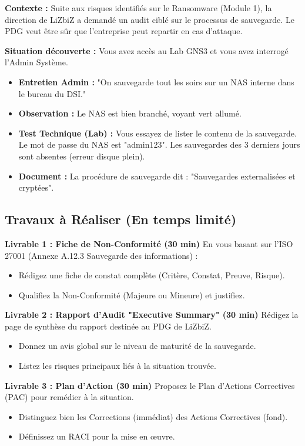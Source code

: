 \begin{boxlizbiz}
\textbf{Contexte :}
Suite aux risques identifiés sur le Ransomware (Module 1), la direction de LiZbiZ a demandé un audit ciblé sur le processus de sauvegarde. Le PDG veut être sûr que l'entreprise peut repartir en cas d'attaque.

\textbf{Situation découverte :}
Vous avez accès au Lab GNS3 et vous avez interrogé l'Admin Système.
\begin{itemize}
    \item \textbf{Entretien Admin :} "On sauvegarde tout les soirs sur un NAS interne dans le bureau du DSI."
    \item \textbf{Observation :} Le NAS est bien branché, voyant vert allumé.
    \item \textbf{Test Technique (Lab) :} Vous essayez de lister le contenu de la sauvegarde. Le mot de passe du NAS est "admin123". Les sauvegardes des 3 derniers jours sont absentes (erreur disque plein).
    \item \textbf{Document :} La procédure de sauvegarde dit : "Sauvegardes externalisées et cryptées".
\end{itemize}
\end{boxlizbiz}

\subsection{Travaux à Réaliser (En temps limité)}

\textbf{Livrable 1 : Fiche de Non-Conformité (30 min)}
En vous basant sur l'ISO 27001 (Annexe A.12.3 Sauvegarde des informations) :
\begin{itemize}
    \item Rédigez une fiche de constat complète (Critère, Constat, Preuve, Risque).
    \item Qualifiez la Non-Conformité (Majeure ou Mineure) et justifiez.
\end{itemize}

\textbf{Livrable 2 : Rapport d'Audit "Executive Summary" (30 min)}
Rédigez la page de synthèse du rapport destinée au PDG de LiZbiZ.
\begin{itemize}
    \item Donnez un avis global sur le niveau de maturité de la sauvegarde.
    \item Listez les risques principaux liés à la situation trouvée.
\end{itemize}

\textbf{Livrable 3 : Plan d'Action (30 min)}
Proposez le Plan d'Actions Correctives (PAC) pour remédier à la situation.
\begin{itemize}
    \item Distinguez bien les Corrections (immédiat) des Actions Correctives (fond).
    \item Définissez un RACI pour la mise en œuvre.
\end{itemize}

